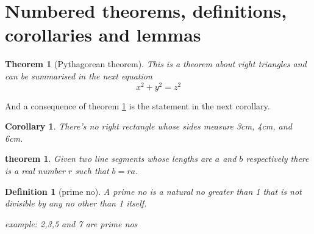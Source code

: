 \documentclass{article}
\newtheorem{theorem} {Theorem} [section]
\newtheorem{corollary} {Corollary} [theorem]
\newtheorem{lemma} {theorem} [Lemma]
\newtheorem{definition} {Definition} [section]
\begin{document}
\section{Numbered theorems, definitions, corollaries and lemmas}
\begin{theorem} [Pythagorean theorem]
\label{pythagorean}
This is a theorem about right triangles and can be summarised in the next equation \[ x^2 + y^2 = z^2 \]
\end{theorem}
And a consequence of theorem \ref{pythagorean} is the statement in the next corollary.
\begin{corollary}
There's no right rectangle whose sides measure 3cm, 4cm, and 6cm.
\end{corollary}
\begin{lemma}
Given two line segments whose lengths are \(a\) and \(b\) respectively there is a real number \(r\) such that \(b=ra\).
\end{lemma}
\begin{definition} [prime no]
A prime no is a natural no greater than 1 that is not divisible by any no other than 1 itself.
\item example: 2,3,5 and 7 are prime nos
\end{definition}
\end{document}
